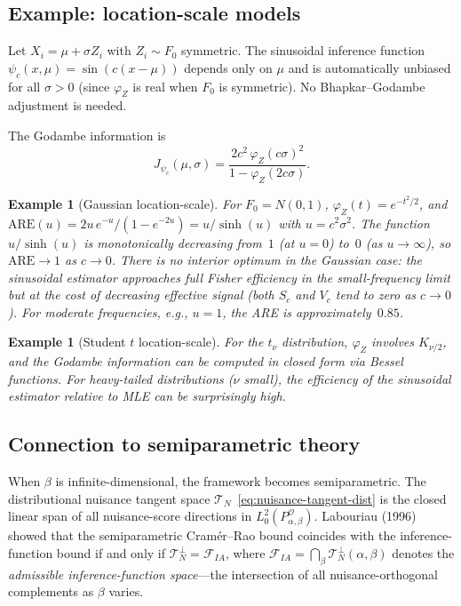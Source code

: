 \documentclass[11pt,a4paper]{article}
\newtheorem{example}[theorem]{Example}
\newcommand{\eg}{{e.g.}, }
\begin{document}
\subsection{Example: location-scale models}\label{subsec:locscale}

Let $X_i = \mu + \sigma Z_i$ with $Z_i \sim F_0$ symmetric.  The
sinusoidal inference function $\psi_c(x, \mu) = \sin(c(x - \mu))$ depends
only on $\mu$ and is automatically unbiased for all $\sigma > 0$
(since $\varphi_Z$ is real when $F_0$ is symmetric).  No Bhapkar--Godambe
adjustment is needed.

The Godambe information is
\[
J_{\psi_c}(\mu, \sigma)
= \frac{2c^2\,\varphi_Z(c\sigma)^2}{1 - \varphi_Z(2c\sigma)}.
\]

\begin{example}[Gaussian location-scale]\label{ex:gauss-locscale}
For $F_0 = N(0,1)$, $\varphi_Z(t) = e^{-t^2/2}$, and
$\mathrm{ARE}(u) = 2u\,e^{-u}/(1 - e^{-2u}) = u/\sinh(u)$ with
$u = c^2\sigma^2$.  The function $u/\sinh(u)$ is monotonically decreasing
from~$1$ (at $u = 0$) to~$0$ (as $u \to \infty$), so
$\mathrm{ARE} \to 1$ as $c \to 0$.  There is no interior optimum in the
Gaussian case: the sinusoidal estimator approaches full Fisher efficiency
in the small-frequency limit but at the cost of decreasing effective
signal (both $S_c$ and $V_c$ tend to zero as $c \to 0$).  For moderate
frequencies, \eg $u = 1$, the ARE is approximately~$0.85$.
\end{example}

\begin{example}[Student $t$ location-scale]\label{ex:t-locscale}
For the $t_\nu$ distribution, $\varphi_Z$ involves $K_{\nu/2}$, and the
Godambe information can be computed in closed form via Bessel functions.
For heavy-tailed distributions ($\nu$ small), the efficiency of the
sinusoidal estimator relative to MLE can be surprisingly high.
\end{example}

\subsection{Connection to semiparametric theory}\label{subsec:semiparametric}

When $\beta$ is infinite-dimensional, the framework becomes semiparametric.
The distributional nuisance tangent space
$\mathcal T_N$~\eqref{eq:nuisance-tangent-dist} is the closed linear span
of all nuisance-score directions in $L^2_0(P_{\alpha,\beta}^{\mathcal O})$.
Labouriau (1996) showed that the semiparametric Cram\'er--Rao bound
coincides with the inference-function bound if and only if
$\mathcal T_N^\perp = \mathcal F_{IA}$, where
$\mathcal F_{IA} = \bigcap_\beta \mathcal T_N^\perp(\alpha, \beta)$
denotes the \emph{admissible inference-function space}---the intersection
of all nuisance-orthogonal complements as $\beta$ varies.
\end{document}
